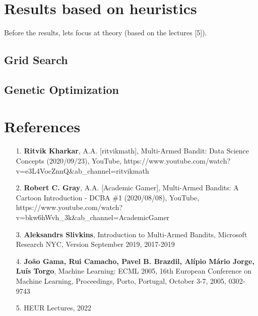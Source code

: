 \documentclass[11pt,american,czech]{article}
\begin{document}
\section*{Results based on heuristics}
Before the results, lets focus at theory (based on the lectures [5]).

	\subsection*{Grid Search}
	
	\subsection*{Genetic Optimization}


	\clearpage
	\section*{References}
	\begin{enumerate}
		\item[1.] \textbf{Ritvik Kharkar}, A.A. [ritvikmath], Multi-Armed Bandit: Data Science Concepts (2020/09/23), YouTube, https://www.youtube.com/watch?v=e3L4VocZnnQ\&ab\_channel=ritvikmath
		\item[2.] \textbf{Robert C. Gray}, A.A. [Academic Gamer], Multi-Armed Bandits: A Cartoon Introduction - DCBA \#1 (2020/08/08), YouTube, \\https://www.youtube.com/watch?v=bkw6hWvh\_3k\&ab\_channel=AcademicGamer
		\item[3.] \textbf{Aleksandrs Slivkins}, Introduction to Multi-Armed Bandits, Microsoft Research NYC, Version September 2019, 2017-2019
		\item[4.] \textbf{João Gama, Rui Camacho, Pavel B. Brazdil, Alípio Mário Jorge, Luís Torgo}, Machine Learning: ECML 2005, 16th European Conference on Machine Learning, Proceedings, Porto, Portugal, October 3-7, 2005, 0302-9743
		\item[5.] HEUR Lectures, 2022
	\end{enumerate}
	
\end{document}
